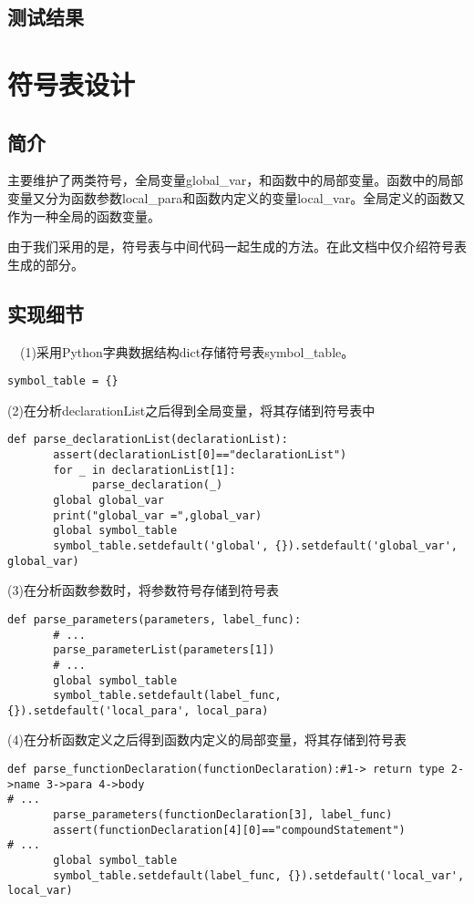 \documentclass{article}
\begin{document}
\subsection{测试结果}

\section{符号表设计}

\subsection{简介}

主要维护了两类符号，全局变量global\_var，和函数中的局部变量。函数中的局部变量又分为函数参数local\_para和函数内定义的变量local\_var。全局定义的函数又作为一种全局的函数变量。

由于我们采用的是，符号表与中间代码一起生成的方法。在此文档中仅介绍符号表生成的部分。

\subsection{实现细节}

\quad \ \ (1)采用Python字典数据结构dict存储符号表symbol\_table。
\begin{verbatim}
symbol_table = {}
\end{verbatim}


(2)在分析declarationList之后得到全局变量，将其存储到符号表中
\begin{verbatim}
def parse_declarationList(declarationList):
       assert(declarationList[0]=="declarationList")
       for _ in declarationList[1]:
             parse_declaration(_)
       global global_var
       print("global_var =",global_var)
       global symbol_table
       symbol_table.setdefault('global', {}).setdefault('global_var', global_var)
\end{verbatim}


(3)在分析函数参数时，将参数符号存储到符号表
\begin{verbatim}
def parse_parameters(parameters, label_func):
       # ...
       parse_parameterList(parameters[1])
       # ...
       global symbol_table
       symbol_table.setdefault(label_func, {}).setdefault('local_para', local_para)
\end{verbatim}

(4)在分析函数定义之后得到函数内定义的局部变量，将其存储到符号表
\begin{verbatim}
def parse_functionDeclaration(functionDeclaration):#1-> return type 2->name 3->para 4->body
# ...
       parse_parameters(functionDeclaration[3], label_func)
       assert(functionDeclaration[4][0]=="compoundStatement")
# ...
       global symbol_table
       symbol_table.setdefault(label_func, {}).setdefault('local_var', local_var)
\end{verbatim}
\end{document}

